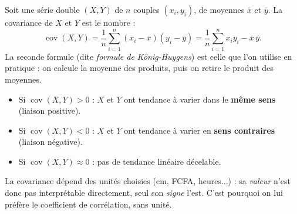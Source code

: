 \documentclass[11pt]{article}
\newcommand{\cle}[1]{{\popxbold\color{popdark}#1}}
\begin{document}
\begin{definition}[Covariance]
Soit une série double $(X, Y)$ de $n$ couples $(x_i, y_i)$, de moyennes $\bar{x}$ et $\bar{y}$. La \cle{covariance} de $X$ et $Y$ est le nombre :
\[ \operatorname{cov}(X,Y) = \frac{1}{n}\sum_{i=1}^{n}(x_i - \bar{x})(y_i - \bar{y}) = \frac{1}{n}\sum_{i=1}^{n} x_i y_i - \bar{x}\,\bar{y}. \]
La seconde formule (dite \emph{formule de König-Huygens}) est celle que l'on utilise en pratique : on calcule la moyenne des produits, puis on retire le produit des moyennes.
\end{definition}

\begin{propriete}
\begin{itemize}
\item Si $\operatorname{cov}(X,Y) > 0$ : $X$ et $Y$ ont tendance à varier dans le \textbf{même sens} (liaison positive).
\item Si $\operatorname{cov}(X,Y) < 0$ : $X$ et $Y$ ont tendance à varier en \textbf{sens contraires} (liaison négative).
\item Si $\operatorname{cov}(X,Y) \approx 0$ : pas de tendance linéaire décelable.
\end{itemize}
La covariance dépend des unités choisies (cm, FCFA, heures...) : sa \emph{valeur} n'est donc pas interprétable directement, seul son \emph{signe} l'est. C'est pourquoi on lui préfère le coefficient de corrélation, sans unité.
\end{propriete}
\end{document}
